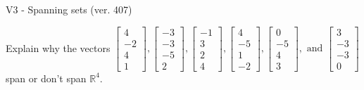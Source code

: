 \begin{exercise}
  \begin{exerciseTitle}V3 - Spanning sets (ver. 407)\end{exerciseTitle}
  \begin{exerciseStatement}
    Explain why the vectors \(\left[\begin{array}{r}
4 \\
-2 \\
4 \\
1
\end{array}\right] , \left[\begin{array}{r}
-3 \\
-3 \\
-5 \\
2
\end{array}\right] , \left[\begin{array}{r}
-1 \\
3 \\
2 \\
4
\end{array}\right] , \left[\begin{array}{r}
4 \\
-5 \\
1 \\
-2
\end{array}\right] , \left[\begin{array}{r}
0 \\
-5 \\
4 \\
3
\end{array}\right] , \text{ and } \left[\begin{array}{r}
3 \\
-3 \\
-3 \\
0
\end{array}\right]\) span or don't span \(\mathbb{R}^4\). 
	



\end{exerciseStatement}
\end{exercise}
